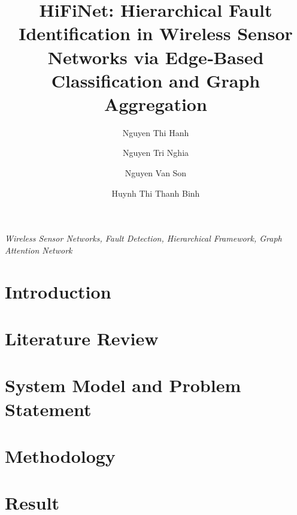 \documentclass[preprint,12pt]{elsarticle}
\begin{document}
\begin{frontmatter}

\title{HiFiNet: Hierarchical Fault Identification in Wireless Sensor Networks via Edge‑Based Classification and Graph Aggregation}

\author[fidt:pnk]{Nguyen Thi Hanh}
\author[hust]{Nguyen Tri Nghia}
\author[fcs:pnk]{Nguyen Van Son}
\author[hust]{Huynh Thi Thanh Binh}
\address[fidt:pnk]{Faculty of Interdisciplinary Digital Technology (FIDT), PHENIKAA University, Vietnam}
\address[hust]{Hanoi University of Science and Technology, Vietnam}
\address[fcs:pnk]{Faculty of Computer Science, PHENIKAA University, Yen Nghia, Ha Dong, Hanoi 12116, Vietnam}



\begin{keyword}
\textit{Wireless Sensor Networks, Fault Detection, Hierarchical Framework, Graph Attention Network}
\end{keyword}

\end{frontmatter}

\section{Introduction}


\section{Literature Review}


\section{System Model and Problem Statement}


\section{Methodology}


\section{Result}


\clearpage

\end{document}
